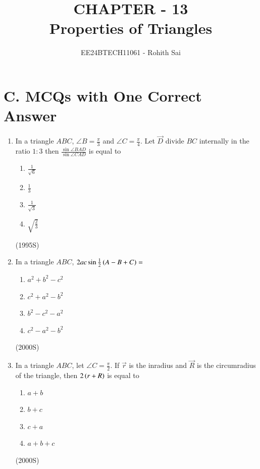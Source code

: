 \documentclass[journal]{IEEEtran}
\begin{document}

\vspace{3cm}

\title{CHAPTER - 13\\Properties of Triangles}
\author{EE24BTECH11061 - Rohith Sai}
\maketitle

\renewcommand{\thefigure}{\theenumi}
\renewcommand{\thetable}{\theenumi}

\section{C. MCQs with One Correct Answer}
\begin{enumerate}
\item In a triangle $ABC$, $\angle B = \frac{\pi}{3}$ and $\angle C = \frac{\pi}{4}$. Let $\vec{D}$ divide $BC$ internally in the ratio $1\colon3$ then $\frac{\sin\angle BAD}{\sin \angle CAD}$ is equal to
\begin{enumerate}
\item $\frac{1}{\sqrt6}$
\item $\frac{1}{3}$
\item $\frac{1}{\sqrt3}$
\item $\sqrt{\frac{2}{3}}$
\end{enumerate}
\hfill (1995S)

\item In a triangle $ABC$, $2ac\sin\frac{1}{2}\left(A-B+C\right) = $
\begin{enumerate}
\item $a^2 + b^2 - c^2$
\item $c^2 + a^2 - b^2$
\item $b^2 - c^2 - a^2$
\item $c^2 - a^2 - b^2$
\end{enumerate}
\hfill (2000S)

\item In a triangle $ABC$, let $\angle C = \frac{\pi}{2}$. If $\vec{r}$ is the inradius and $\vec{R}$ is the circumradius of the triangle, then $2\left(r+R\right)$ is equal to
\begin{enumerate}
\item $a+b$
\item $b+c$
\item $c+a$
\item $a+b+c$
\end{enumerate}
\hfill (2000S)


\end{enumerate}
\end{document}
